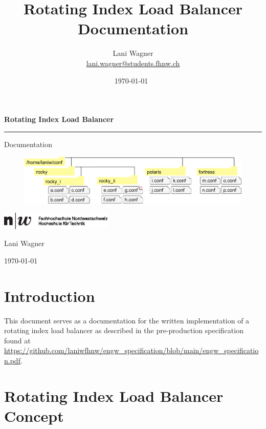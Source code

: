 \documentclass[11pt]{article} %
\title{Rotating Index Load Balancer Documentation}
\author{Lani Wagner\\\href{mailto:lani.wagner@students.fhnw.ch}{lani.wagner@students.fhnw.ch}}
\date{\today\ \currenttime} %
\newcommand{\rilb}{Rotating Index Load Balancer}
\begin{document}
  \begin{titlepage}
    \begin{center}
      \vspace*{1cm}

      \textbf{\Huge \rilb}

      \vspace{1.5cm}
      \hrule
      \vspace{1cm}

      {\Large Documentation}

      \vspace{2.5cm}


      \begin{figure}[H]
        \centering
        \includegraphics[width=.9\linewidth, keepaspectratio]{res/rilb_visualization}
        \label{fig:rilb-vis-title}
      \end{figure}

      \vfill

      \includegraphics[width=0.4\textwidth]{res/fhnw_ht_10mm}

      \vspace{0.8cm}

      Lani Wagner

      \today\ \currenttime

    \end{center}
  \end{titlepage}

  \section*{Introduction}

  This document serves as a documentation for the written implementation of a rotating index load balancer as described in the pre-production specification found at \url{https://github.com/laniwfhnw/engw_specification/blob/main/engw_specification.pdf}.

    {\hypersetup{hidelinks} \tableofcontents}
  \newpage



  \section{\rilb{} Concept}\label{sec:2}
\end{document}
